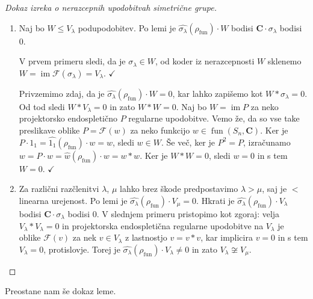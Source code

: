 \documentclass[11pt]{book}
\def\CC{\mathbf{C}}
\def\Fcal{\mathcal{F}}
\def\youngsym{\sigma_{\lambda}}
\DeclareMathOperator\image{im}
\DeclareMathOperator\fun{fun}
\def\kljuka{$\checkmark$}
\theoremstyle{definition}
\theoremstyle{zgled}
\theoremstyle{odprtproblem}
\theoremstyle{domacanaloga}
\newenvironment{dokaz}
    {\color{siva}\begin{proof}}
    {\end{proof}}
\theoremstyle{izrek}
\begin{document}
\begin{dokaz}[Dokaz izreka o nerazcepnih upodobitvah simetrične grupe] \leavevmode
\begin{enumerate}
    \item Naj bo $W \leq V_{\lambda}$ podupodobitev. Po lemi je $\widehat{\youngsym}(\rho_{\fun}) \cdot W$ bodisi $\CC \cdot \youngsym$ bodisi $0$. 
    
    V prvem primeru sledi, da je $\youngsym \in W$, od koder iz nerazcepnosti $W$ sklenemo $W = \image \Fcal(\youngsym) = V_{\lambda}$. \kljuka
    
    Privzemimo zdaj, da je $\widehat{\youngsym}(\rho_{\fun}) \cdot W = 0$, kar lahko zapišemo kot $W * \youngsym = 0$. Od tod sledi $W * V_{\lambda} = 0$ in zato $W * W = 0$. Naj bo $W = \image P$ za neko projektorsko endospletično $P$ regularne upodobitve. Vemo že, da so vse take preslikave oblike $P = \Fcal(w)$ za neko funkcijo $w \in \fun(S_n, \CC)$. Ker je $P \cdot 1_1 = \widehat{1_1}(\rho_{\fun}) \cdot w = w$, sledi $w \in W$. Še več, ker je $P^2 = P$, izračunamo $w = P \cdot w = \widehat{w}(\rho_{\fun}) \cdot w = w * w$. Ker je $W * W = 0$, sledi $w = 0$ in s tem $W = 0$. \kljuka

    \item Za različni razčlenitvi $\lambda$, $\mu$ lahko brez škode predpostavimo $\lambda > \mu$, saj je $<$ linearna urejenost. Po lemi je $\widehat{\youngsym}(\rho_{\fun}) \cdot V_{\mu} = 0$. Hkrati je $\widehat{\youngsym}(\rho_{\fun}) \cdot V_{\lambda}$ bodisi $\CC \cdot \youngsym$ bodisi $0$. V slednjem primeru pristopimo kot zgoraj: velja $V_{\lambda} * V_{\lambda} = 0$ in projektorska endospletična regularne upodobitve na $V_{\lambda}$ je oblike $\Fcal(v)$ za nek $v \in V_{\lambda}$ z lastnostjo $v = v * v$, kar implicira $v = 0$ in s tem $V_{\lambda} = 0$, protislovje. Torej je $\widehat{\youngsym}(\rho_{\fun}) \cdot V_{\lambda} \neq 0$ in zato $V_{\lambda} \not\cong V_{\mu}$.
\end{enumerate}
\end{dokaz}

Preostane nam še dokaz leme.
\end{document}

